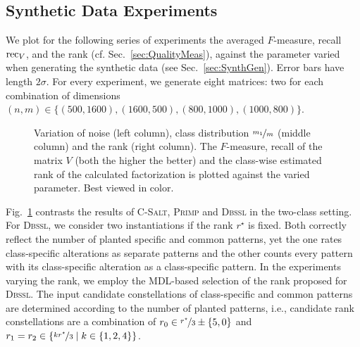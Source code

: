 \subsection{Synthetic Data Experiments}\label{sec:synthExp}
We plot for the following series of experiments the averaged $F$-measure, recall $\operatorname*{rec}_V$, and the rank (cf. Sec.~\ref{sec:QualityMeas}), against the parameter varied when generating the synthetic data  (see Sec.~\ref{sec:SynthGen}). Error bars have length $2\sigma$. For every experiment, we generate eight matrices: two for each combination of dimensions $(n,m)\in\{(500,1600),\allowbreak(1600,500),\allowbreak(800,1000),\allowbreak(1000,800)\}$.
\begin{figure}[t!]
\centering

\caption{Variation of noise (left column), class distribution $\nicefrac{m_1}{m}$ (middle column) and the rank (right column). The $F$-measure, recall of the matrix $V$ (both the higher the better) and the class-wise estimated rank of the calculated factorization is plotted against the varied parameter. Best viewed in color.}
\label{fig:noise}
\end{figure}

Fig.~\ref{fig:noise} contrasts the results of \textsc{C-Salt}, \textsc{Primp} and \textsc{Dbssl} in the two-class setting. For \textsc{Dbssl}, we consider two instantiations if the rank $r^\star$ is fixed. Both correctly reflect the number of planted specific and common patterns, yet the one rates class-specific alterations as separate patterns and the other counts every pattern with its class-specific alteration as a class-specific pattern. In the experiments varying the rank, we employ the MDL-based selection of the rank proposed for \textsc{Dbssl}. The input candidate constellations of class-specific and common patterns are determined according to the number of planted patterns, i.e., candidate rank constellations are a combination of $r_0\in \nicefrac{r^\star}{3}\pm\{5,0\}$ and  $r_{1}=r_2\in \{\nicefrac{kr^\star}{3}\mid k\in \{1,2,4\}\}$.

